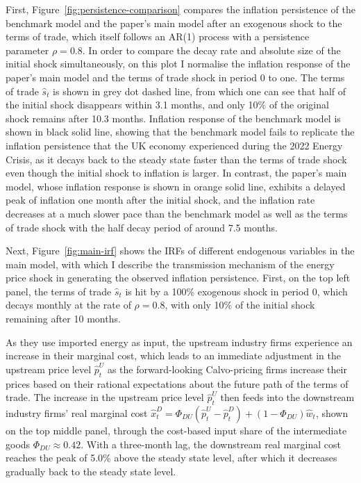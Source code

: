 \documentclass[a4paper, 12pt]{article}
\theoremstyle{definition*}
\begin{document}
First, Figure~\ref{fig:persistence-comparison} compares the inflation persistence of the benchmark model and the paper's main model after an exogenous shock to the terms of trade, which itself follows an AR(1) process with a persistence parameter $\rho = 0.8$.
In order to compare the decay rate and absolute size of the initial shock simultaneously, on this plot I normalise the inflation response of the paper's main model and the terms of trade shock in period 0 to one.
The terms of trade $\hat s_t$ is shown in grey dot dashed line, from which one can see that half of the initial shock disappears within 3.1 months, and only 10\% of the original shock remains after 10.3 months.
Inflation response of the benchmark model is shown in black solid line, showing that the benchmark model fails to replicate the inflation persistence that the UK economy experienced during the 2022 Energy Crisis, as it decays back to the steady state faster than the terms of trade shock even though the initial shock to inflation is larger.
In contrast, the paper's main model, whose inflation response is shown in orange solid line, exhibits a delayed peak of inflation one month after the initial shock, and the inflation rate decreases at a much slower pace than the benchmark model as well as the terms of trade shock with the half decay period of around 7.5 months.

Next, Figure~\ref{fig:main-irf} shows the IRFs of different endogenous variables in the main model, with which I describe the transmission mechanism of the energy price shock in generating the observed inflation persistence.
First, on the top left panel, the terms of trade $\hat s_t$ is hit by a 100\% exogenous shock in period 0, which decays monthly at the rate of $\rho = 0.8$, with only 10\% of the initial shock remaining after 10 months.

As they use imported energy as input, the upstream industry firms experience an increase in their marginal cost, which leads to an immediate adjustment in the upstream price level $\hat p^U_t$ as the forward-looking Calvo-pricing firms increase their prices based on their rational expectations about the future path of the terms of trade.
The increase in the upstream price level $\hat p^U_t$ then feeds into the downstream industry firms' real marginal cost $\hat x^D_t = \Phi_{DU}(\hat p^U_t - \hat p^D_t) + (1 - \Phi_{DU})\hat w_t$, shown on the top middle panel, through the cost-based input share of the intermediate goods $\Phi_{DU} \approx 0.42$.
With a three-month lag, the downstream real marginal cost reaches the peak of 5.0\% above the steady state level, after which it decreases gradually back to the steady state level.
\end{document}
